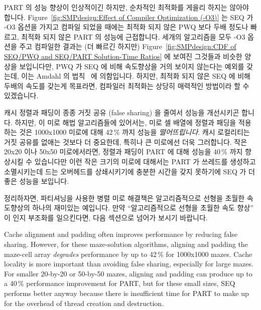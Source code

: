 PART 의 성능 향상이 인상적이긴 하지만, 순차적인 최적화를 게을리 하지는 않아야
합니다.
Figure~\ref{fig:SMPdesign:Effect of Compiler Optimization (-O3)} 는 SEQ 가 -O3
옵션을 가지고 컴파일 되었을 때에는 최적화 되지 않은 PWQ 보다 두배 정도나
빠르고, 최적화 되지 않은 PART 의 성능에 근접합니다.
세개의 알고리즘을 모두 -O3 옵션을 주고 컴파일한 결과는 (더 빠르긴 하지만)
Figure~\ref{fig:SMPdesign:CDF of SEQ/PWQ and SEQ/PART Solution-Time Ratios} 에
보여진 그것들과 비슷한 양상을 보입니다만, PWQ 가 SEQ 에 비해 속도향상을 거의
보이지 않는다는 예외를 갖는데, 이는
Amdahl 의 법칙~\cite{GeneAmdahl1967AmdahlsLaw} 에 의함입니다.
하지만, 최적화 되지 않은 SEQ 에 비해 두배의 속도를 갖는게 목표라면, 컴파일러
최적화는 상당히 매력적인 방법이라 할 수 있겠습니다.

캐시 정렬과 패딩이 종종 거짓 공유 (false sharing) 을 줄여서 성능을 개선시키곤
합니다.
하지만, 이 미로 해법 알고리즘들에 있어서는, 미로 셀 배열에 정렬과 패딩을
적용하는 것은 1000x1000 미로에 대해 42\,\% 까지 성능을 \emph{떨어뜨립니다}.
캐시 로컬리티는 거짓 공유를 없애는 것보다 더 중요한데, 특히나 큰 미로에선 더욱
그러합니다.
작은 20x20 이나 50x50 미로에서라면, 정렬과 패딩이 PART 에 대해 성능을 40\,\% 까지
향상시킬 수 있습니다만 이런 작은 크기의 미로에 대해서는 PART 가 쓰레드를
생성하고 소멸시키는데 드는 오버헤드를 상쇄시키기에 충분한 시간을 갖지 못하기에
SEQ 가 더 좋은 성능을 보입니다.

정리하자면, 파티셔닝을 사용한 병렬 미로 해결책은 알고리즘적으로 선형을 초월한
속도향상의 하나의 재미있는 예입니다.
만약 ``알고리즘적으로 선형을 초월한 속도 향상'' 이 인지 부조화를 일으킨다면,
다음 섹션으로 넘어가 보시기 바랍니다.
\iffalse

Cache alignment and padding often improves performance by reducing
false sharing.
However, for these maze-solution algorithms, aligning and padding the
maze-cell array \emph{degrades} performance by up to 42\,\% for 1000x1000 mazes.
Cache locality is more important than avoiding
false sharing, especially for large mazes.
For smaller 20-by-20 or 50-by-50 mazes, aligning and padding can produce
up to a 40\,\% performance improvement for PART,
but for these small sizes, SEQ performs better anyway because there
is insufficient time for PART to make up for the overhead of
thread creation and destruction.

